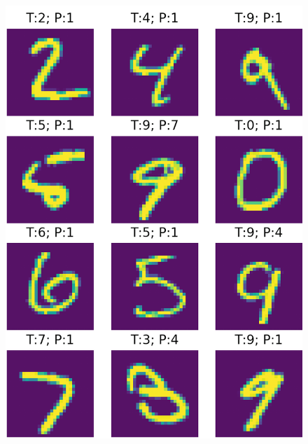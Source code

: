 \documentclass{article}
\begin{document}
\begin{figure}
\centering
\begin{minipage}[t]{.5\textwidth}
  \centering
  \includegraphics[width=0.9\linewidth]{images/correct_class.png}
  \label{fig:right}
\end{minipage}%
\begin{minipage}[t]{.5\textwidth}
  \centering

\end{minipage}
\end{figure}
\end{document}
